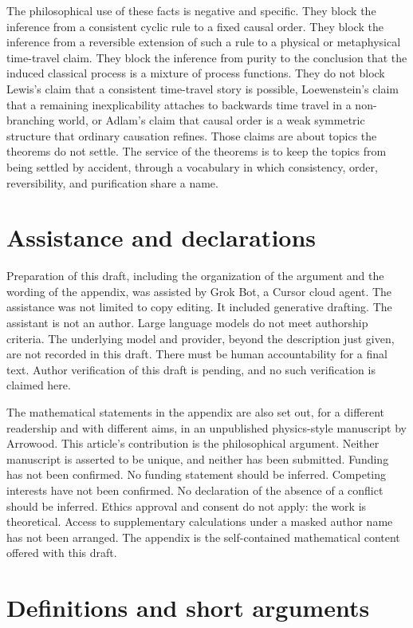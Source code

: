 \documentclass[11pt]{article}
\begin{document}
The philosophical use of these facts is negative and specific. They block the inference from a consistent cyclic rule to a fixed causal order. They block the inference from a reversible extension of such a rule to a physical or metaphysical time-travel claim. They block the inference from purity to the conclusion that the induced classical process is a mixture of process functions. They do not block Lewis's claim that a consistent time-travel story is possible, Loewenstein's claim that a remaining inexplicability attaches to backwards time travel in a non-branching world, or Adlam's claim that causal order is a weak symmetric structure that ordinary causation refines. Those claims are about topics the theorems do not settle. The service of the theorems is to keep the topics from being settled by accident, through a vocabulary in which consistency, order, reversibility, and purification share a name.

\section{Assistance and declarations}
\label{sec:assist}

Preparation of this draft, including the organization of the argument and the wording of the appendix, was assisted by Grok Bot, a Cursor cloud agent. The assistance was not limited to copy editing. It included generative drafting. The assistant is not an author. Large language models do not meet authorship criteria. The underlying model and provider, beyond the description just given, are not recorded in this draft. There must be human accountability for a final text. Author verification of this draft is pending, and no such verification is claimed here.

The mathematical statements in the appendix are also set out, for a different readership and with different aims, in an unpublished physics-style manuscript by Arrowood. This article's contribution is the philosophical argument. Neither manuscript is asserted to be unique, and neither has been submitted. Funding has not been confirmed. No funding statement should be inferred. Competing interests have not been confirmed. No declaration of the absence of a conflict should be inferred. Ethics approval and consent do not apply: the work is theoretical. Access to supplementary calculations under a masked author name has not been arranged. The appendix is the self-contained mathematical content offered with this draft.

\appendix
\section{Definitions and short arguments}
\label{app:math}
\end{document}

